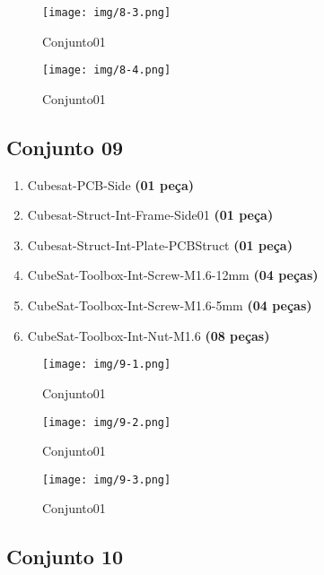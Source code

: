 \begin{figure}[ht!]
	\centering
	\texttt{[image: img/8-3.png]}
	\caption{Conjunto01}
	\label{8-3}
\end{figure}

\begin{figure}[ht!]
	\centering
	\texttt{[image: img/8-4.png]}
	\caption{Conjunto01}
	\label{8-4}
\end{figure}



\newpage
\subsection{Conjunto 09}\label{subs:c09}

\begin{enumerate}[label*=\ref*{subs:c09}\arabic*]
	\item Cubesat-PCB-Side \textbf{(01 peça)}
	\item Cubesat-Struct-Int-Frame-Side01 \textbf{(01 peça)}
	\item Cubesat-Struct-Int-Plate-PCBStruct \textbf{(01 peça)}
	\item CubeSat-Toolbox-Int-Screw-M1.6-12mm \textbf{(04 peças)}
	\item CubeSat-Toolbox-Int-Screw-M1.6-5mm \textbf{(04 peças)}
	\item CubeSat-Toolbox-Int-Nut-M1.6 \textbf{(08 peças)}
\end{enumerate}

\begin{figure}[ht!]
	\centering
	\texttt{[image: img/9-1.png]}
	\caption{Conjunto01}
	\label{9-1}
\end{figure}

\begin{figure}[ht!]
	\centering
	\texttt{[image: img/9-2.png]}
	\caption{Conjunto01}
	\label{9-2}
\end{figure}

\begin{figure}[ht!]
	\centering
	\texttt{[image: img/9-3.png]}
	\caption{Conjunto01}
	\label{9-3}
\end{figure}



\newpage
\subsection{Conjunto 10}\label{subs:c10}

